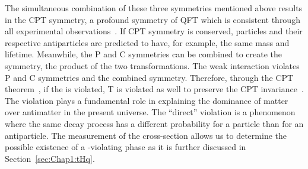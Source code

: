 The simultaneous combination of these three symmetries mentioned above results in the CPT symmetry, a profound symmetry of QFT which is
consistent through all experimental observations~\cite{Streater:1989vi}. If CPT symmetry is conserved, particles and their respective antiparticles 
are predicted to have, for example, the same mass and lifetime. %
Meanwhile, the P and C symmetries can be combined to create the \CP symmetry, the product of the two transformations.
The weak interaction violates P and C symmetries and the combined \CP symmetry. 
Therefore, through the CPT theorem~\cite{Bell:1955djs}, if the \CP is violated,
T is violated as well to preserve the CPT invariance~\cite{Streater:1989vi}. %
 The \CP violation plays a fundamental role in explaining the dominance of 
 matter over antimatter in the present universe. 
The ``direct'' \CP violation is a phenomenon where the same decay process has a different probability for a 
particle than for an antiparticle. The measurement of the \tHq cross-section %
allows us to determine the possible existence of a \CP-violating 
phase as it is further discussed in Section~\ref{sec:Chap1:tHq}.



